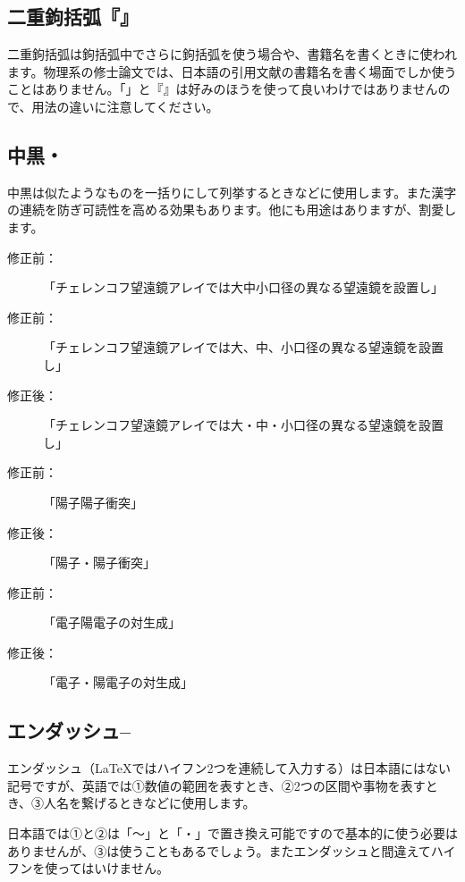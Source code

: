 \subsection{二重鉤括弧『』}

二重鉤括弧は鉤括弧中でさらに鉤括弧を使う場合や、書籍名を書くときに使われます。物理系の修士論文では、日本語の引用文献の書籍名を書く場面でしか使うことはありません。「」と『』は好みのほうを使って良いわけではありませんので、用法の違いに注意してください。

\subsection{中黒・}

中黒は似たようなものを一括りにして列挙するときなどに使用します。また漢字の連続を防ぎ可読性を高める効果もあります。他にも用途はありますが、割愛します。

\begin{description}
\item[修正前：]「チェレンコフ望遠鏡アレイでは大中小口径の異なる望遠鏡を設置し」
\item[修正前：]「チェレンコフ望遠鏡アレイでは大、中、小口径の異なる望遠鏡を設置し」
\item[修正後：]「チェレンコフ望遠鏡アレイでは大・中・小口径の異なる望遠鏡を設置し」
\end{description}

\begin{description}
\item[修正前：]「陽子陽子衝突」
\item[修正後：]「陽子・陽子衝突」
\end{description}

\begin{description}
\item[修正前：]「電子陽電子の対生成」
\item[修正後：]「電子・陽電子の対生成」
\end{description}

\subsection{エンダッシュ--}

エンダッシュ（\LaTeX ではハイフン2つを連続して入力する）は日本語にはない記号ですが、英語では①数値の範囲を表すとき、②2つの区間や事物を表すとき、③人名を繋げるときなどに使用します。

日本語では①と②は「〜」と「・」で置き換え可能ですので基本的に使う必要はありませんが、③は使うこともあるでしょう。またエンダッシュと間違えてハイフンを使ってはいけません。


